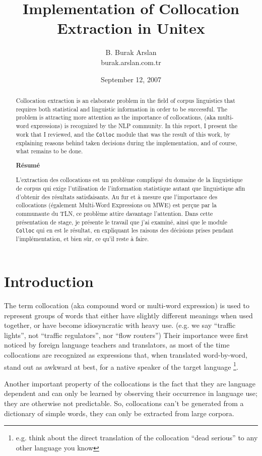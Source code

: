 \documentclass[a4paper,12pt,oneside]{article}
\title{Implementation of Collocation Extraction in Unitex}
\author{B. Burak Arslan \\
burak.arslan\linebreak@arskom.com.tr}
\date{September 12, 2007}
\begin{document}
\maketitle
\begin{abstract}
Collocation extraction is an elaborate problem in the field of corpus linguistics that requires both statistical and linguistic information in order to be successful. The problem is attracting more attention as the importance of collocations, (aka multi-word expressions) is recognized by the NLP community. In this report, I present the work that I reviewed, and the \texttt{Colloc} module that was the result of this work, by explaining reasons behind taken decisions during the implementation, and of course, what remains to be done.

\begin{center}
\textbf{Résumé}
\end{center}

L'extraction des collocations est un problème compliqué du domaine de la linguistique de corpus qui exige l'utilisation de l'information statistique autant que linguistique afin d'obtenir des résultats satisfaisants. Au fur et à mesure que l'importance des collocations (également Multi-Word Expressions ou MWE) est perçue par la communaute du TLN, ce problème attire davantage l'attention. Dans cette présentation de stage, je présente le travail que j'ai examiné, ainsi que le module \texttt{Colloc} qui en est le résultat, en expliquant les raisons des décisions prises pendant l'implémentation, et bien sûr, ce qu'il reste à faire.
\end{abstract}

\section{Introduction}
The term collocation (aka compound word or multi-word expression) is used to represent groups of words that either have slightly different meanings when used together, or have become idiosyncratic with heavy use. 
(e.g. we say ``traffic lights'', not ``traffic regulators'', nor ``flow routers'')
Their importance were first noticed by foreign language teachers and translators, as most of the time collocations are recognized as expressions that, when translated word-by-word, stand out as awkward at best, for a native speaker of the target language
\footnote{e.g. think about the direct translation of the collocation ``dead serious'' to any other language you know}. 

Another important property of the collocations is the fact that they are language dependent and can only be learned by observing their occurrence in language use; they are otherwise not predictable\cite{seretan2003}. So, collocations can't be generated from a dictionary of simple words, they can only be extracted from large corpora.
\end{document}
